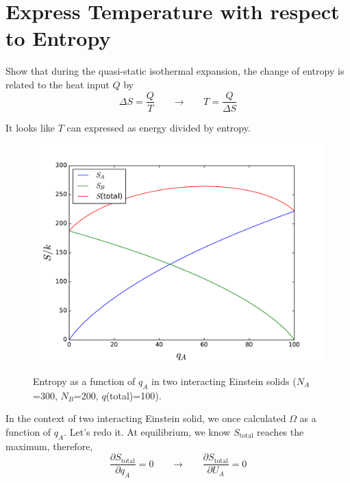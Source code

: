 
\section{Express Temperature with respect to Entropy}
Show that during the quasi-static isothermal expansion, the change of entropy is related to the heat input $Q$ by
\begin{equation} \label{entropy} 
\Delta{S}=\frac{Q}{T}     ~~~~~~~~ \rightarrow~~~~~~~~  T = \frac{Q}{\Delta{S}}
\end{equation}

It looks like $T$ can expressed as energy divided by entropy.

\begin{figure}[h]
\centering
{\includegraphics[width=12cm]{imgs/Einstein3}}
\caption{\label{dS} Entropy as a function of $q_A$ in two interacting Einstein solids ($N_A$=300, $N_B$=200, $q$(total)=100). }
\end{figure}


In the context of two interacting Einstein solid, we once calculated $\Omega$ as a function of $q_A$. Let's redo it.
At equilibrium, we know $S_\text{total}$ reaches the maximum, therefore,
\begin{equation} \label{entropy} 
\frac {\partial{S_\text{total}}} {\partial{q_A}}=0     ~~~~~~~~ \rightarrow~~~~~~~~  \frac {\partial{S_\text{total}}} {\partial{U_A}}=0
\end{equation}

